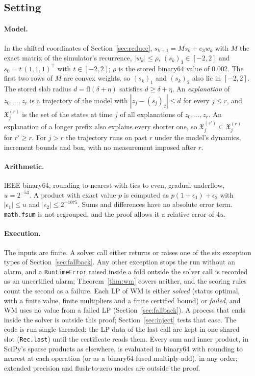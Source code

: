 \documentclass[11pt,a4paper]{article}
\begin{document}
\subsection{Setting}

\paragraph{Model.} In the shifted coordinates of Section~\ref{sec:reduce}, $s_{k+1} = M s_k + e_3 w_k$ with $M$ the exact matrix of
the simulator's recurrence, $|w_k|\le\rho$, $(s_k)_3\in[-2,2]$ and $s_0 = t\,(1,1,1)^\top$ with $t\in[-2,2]$; $\rho$ is
the stored binary64 value of 0.002. The first two rows of $M$ are convex weights, so $(s_k)_1$ and $(s_k)_2$ also lie in
$[-2,2]$. The stored slab radius $d = \mathrm{fl}(\delta+\eta)$ satisfies $d\ge\delta+\eta$. An \emph{explanation} of
$z_0,\dots,z_r$ is a trajectory of the model with $|z_j-(s_j)_2|\le d$ for every $j\le r$, and $\mathfrak{X}^{(r)}_j$ is
the set of the states at time $j$ of all explanations of $z_0,\dots,z_r$. An explanation of a longer prefix also
explains every shorter one, so $\mathfrak{X}^{(r')}_j\subseteq\mathfrak{X}^{(r)}_j$ for $r'\ge r$. For $j>r$ the
trajectory runs on past $r$ under the model's dynamics, increment bounds and box, with no measurement imposed after
$r$.

\paragraph{Arithmetic.} IEEE binary64, rounding to nearest with ties to even, gradual underflow, $u = 2^{-53}$. A
product with exact value $p$ is computed as $p(1+\epsilon_1)+\epsilon_2$ with $|\epsilon_1|\le u$ and
$|\epsilon_2|\le2^{-1075}$. Sums and differences have no absolute error term. \texttt{math.fsum} is not regrouped, and
the proof allows it a relative error of $4u$.

\paragraph{Execution.} The inputs are finite. A solver call either returns or raises one of the
six exception types of Section~\ref{sec:fallback}. Any other exception stops the run without an alarm, and a
\texttt{RuntimeError} raised inside a fold outside the solver call is recorded as an uncertified alarm; Theorem~\ref{thm:wm} covers neither,
and the scoring rules count the second as a failure. Each LP of WM is
either \emph{solved} (status optimal, with a finite value, finite multipliers and a finite certified bound) or
\emph{failed}, and WM uses no value from a failed LP (Section~\ref{sec:fallback}). A process that ends inside the solver
is outside this proof; Section~\ref{sec:inject} tests that case. The code is run single-threaded: the LP data of the
last call are kept in one shared slot (\texttt{Rec.last}) until the certificate reads them. Every sum and inner
product, in SciPy's sparse products as elsewhere, is evaluated in binary64 with rounding to nearest at each operation
(or as a binary64 fused multiply-add), in any order; extended precision and flush-to-zero modes are outside the proof.
\end{document}
